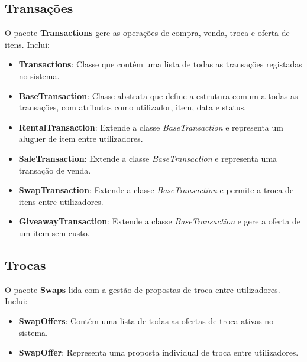 \documentclass[a4paper, 12pt]{article} %
\begin{document}

\subsection{Transações}

O pacote \textbf{Transactions} gere as operações de compra, venda, troca e oferta de itens. Inclui:

\begin{itemize}
	\item \textbf{Transactions}: Classe que contém uma lista de todas as transações registadas no sistema.
	\item \textbf{BaseTransaction}: Classe abstrata que define a estrutura comum a todas as transações, com atributos como utilizador, item, data e status.
	\item \textbf{RentalTransaction}: Extende a classe \textit{BaseTransaction} e representa um aluguer de item entre utilizadores.
	\item \textbf{SaleTransaction}: Extende a classe \textit{BaseTransaction} e representa uma transação de venda.
	\item \textbf{SwapTransaction}: Extende a classe \textit{BaseTransaction} e permite a troca de itens entre utilizadores.
	\item \textbf{GiveawayTransaction}: Extende a classe \textit{BaseTransaction} e gere a oferta de um item sem custo.
\end{itemize}


\subsection{Trocas}

O pacote \textbf{Swaps} lida com a gestão de propostas de troca entre utilizadores. Inclui:

\begin{itemize} 
	\item \textbf{SwapOffers}: Contém uma lista de todas as ofertas de troca ativas no sistema. 
	\item \textbf{SwapOffer}: Representa uma proposta individual de troca entre utilizadores.
\end{itemize}
\end{document}
